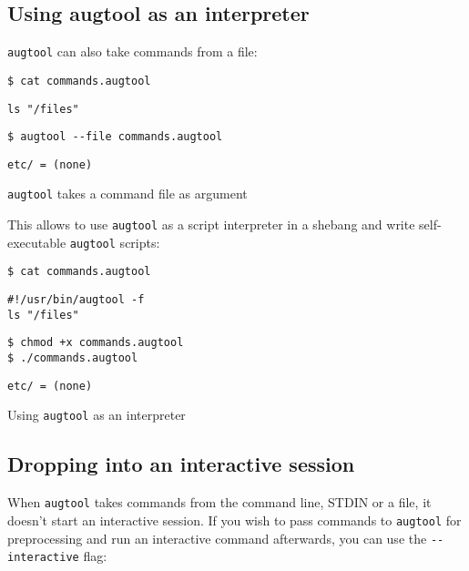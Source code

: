 \subsection{Using augtool as an interpreter}

\verb!augtool! can also take commands from a file:

 

\begin{listing}
  \begin{verbatim}
$ cat commands.augtool
  \end{verbatim}
  \begin{verbatim}
ls "/files"
  \end{verbatim}
  \begin{verbatim}
$ augtool --file commands.augtool
  \end{verbatim}
  \begin{verbatim}
etc/ = (none)
  \end{verbatim}
  \caption{\texttt{augtool} takes a command file as argument}
  \label{lst:augtool_file_arg}
\end{listing}

This allows to use \verb!augtool! as a script interpreter in a shebang and write self-executable \verb!augtool! scripts:

\begin{listing}
  \begin{verbatim}
$ cat commands.augtool
  \end{verbatim}
  \begin{verbatim}
#!/usr/bin/augtool -f
ls "/files"
  \end{verbatim}
  \begin{verbatim}
$ chmod +x commands.augtool
$ ./commands.augtool
  \end{verbatim}
  \begin{verbatim}
etc/ = (none)
  \end{verbatim}
  \caption{Using \texttt{augtool} as an interpreter}
  \label{lst:augtool_interpreter}
\end{listing}

\subsection{Dropping into an interactive session}

When \verb!augtool! takes commands from the command line, STDIN or a file, it doesn't start an interactive session. If you wish to pass commands to \verb!augtool! for preprocessing and run an interactive command afterwards, you can use the \verb!--interactive! flag:

